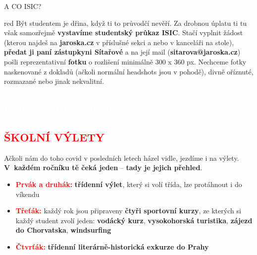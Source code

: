 \documentclass[a5paper, twoside]{article}
\newcommand{\boxik}[3]{
  \begin{tcolorbox}[
    sharp corners,
    colback = #1,
    boxrule = 0pt,
    grow to left by = 25pt,
    grow to right by = 25pt,
    right = 22pt,
    left = 22pt%
  ]
  \textcolor{#2}{#3}
  \end{tcolorbox}
}
\newcommand{\polonadpis}[4]{
  \vspace*{-50pt}
  \begin{tcolorbox}[colback = #2, boxrule = 0pt, grow to left by = #4,  grow to right by = #4, arc=8pt, height = 30pt]
    \vspace*{5pt}
    \centering \subsection*{\textcolor{#3}{#1}}
  \end{tcolorbox}
}
\newcommand{\podnadpis}[2]{
  \subsection*{\textcolor{#2}{#1}}
}
\begin{document}
\boxik{red, white, \textbf{Poznámka.} Ne že bys nejen nesměl jezdit zdravý výtahem, ono to taky dost dobře nejde. Bez oprávnění na čipu tě výtah prostě nebude poslouchat a nepřijede ti. Když už je mysteriózně otevřen na patře prázdný, nikdo ti asi nebude fyzicky bránit do něj naskočit a odjet – ale pokud tě při tom načapá profesor, který to nemá rád, dostaneš bídu. Takže bacha.}

\podnadpis{A CO ISIC?}{red}
Být studentem je dřina, když ti to průvodčí nevěří. Za drobnou úplatu ti tu však samozřejmě \textbf{vystavíme studentský průkaz ISIC}. Stačí vyplnit žádost (kterou najdeš na {\bf jaroska.cz} v příslušné sekci a nebo v kanceláři na stole), \textbf{předat ji paní zástupkyni Sítařové} a na její mail (\textbf{sitarova@jaroska.cz}) pošli reprezentativní \textbf{fotku} o rozlišení minimálně 300 x 360 px. Nechceme fotky naskenované z dokladů (ačkoli normální headshots jsou v pohodě), divně oříznuté, rozmazané nebo jinak
nekvalitní.

\newpage

\polonadpis{I. Jak to u nás chodí}{red}{white}{-4.1cm}

\podnadpis{ŠKOLNÍ VÝLETY}{red}
Ačkoli nám do toho covid v posledních letech házel vidle, jezdíme i na výlety.
\textbf{V~každém ročníku tě čeká jeden} -- \textbf{tady je jejich přehled}.

\begin{itemize}[leftmargin=10pt]
	\item \textcolor{red}{\textbf{Prvák a druhák:}} \textbf{třídenní výlet}, který si volí třída, lze protáhnout i do víkendu
	\item \textcolor{red}{\textbf{Třeťák:}} každý rok jsou připraveny \textbf{čtyři sportovní kurzy}, ze kterých si každý student zvolí jeden: \textbf{vodácký kurz}, \textbf{vysokohorská turistika}, \textbf{zájezd do Chorvatska}, \textbf{windsurfing}
	\item \textcolor{red}{\textbf{Čtvrťák:}} \textbf{třídenní literárně-historická exkurze do Prahy}
\end{itemize}
\end{document}
